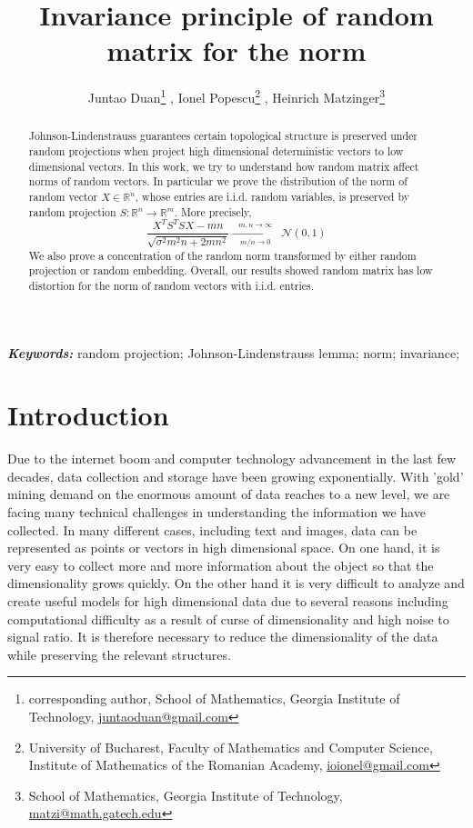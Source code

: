\documentclass[12pt]{extarticle}
\title{Invariance principle of random matrix for the norm}
\author{Juntao Duan\footnote{corresponding author, School of Mathematics, Georgia Institute of Technology, 
    \href{mailto:juntaoduan@gmail.com}{juntaoduan@gmail.com}}
    ,\quad  
    Ionel Popescu\footnote{ University of Bucharest, Faculty of Mathematics and Computer Science, Institute of Mathematics of the Romanian Academy, \href{mailto:ioionel@gmail.com }{ioionel@gmail.com}}
    ,\quad  
    Heinrich Matzinger\footnote{School of Mathematics, Georgia
 Institute of Technology, \href{mailto:matzi@math.gatech.edu}{matzi@math.gatech.edu}}
    }
\newcommand{\1}{\field{1}}
\numberwithin{equation}{section}
\providecommand{\keywords}[1]
{
  \small	
  \textbf{\textit{Keywords: }} #1
}
\begin{document}
\large
\maketitle


\begin{abstract}
	 Johnson-Lindenstrauss guarantees certain topological structure is preserved under random projections when project high dimensional deterministic vectors to low dimensional vectors. In this work, we try to understand how random matrix affect norms of random vectors. In particular we prove the distribution of the norm of random vector $X \in \mathbb{R}^n$, whose entries are i.i.d. random variables, is preserved by random projection $S:\mathbb{R}^n \to \mathbb{R}^m$. More precisely, 
\[
\frac{X^TS^TSX - mn}{\sqrt{\sigma^2 m^2n+2mn^2}} \xrightarrow[\quad m/n\to 0 \quad ]{ m,n\to \infty } \mathcal{N}(0,1)
\]
We also prove a concentration of the random norm transformed by either random projection or random embedding. Overall, our results showed random matrix has low distortion for the norm of random vectors with i.i.d. entries.
\end{abstract}
\keywords{random projection; Johnson-Lindenstrauss lemma;  norm; invariance;} 



\section{Introduction}

     Due to the internet boom and computer technology advancement in the last few decades, data collection and storage have been growing exponentially. With 'gold' mining demand on the enormous amount of data reaches to a new level, we are facing many technical challenges in understanding the information we have collected. In many different cases, including text and images, data can be represented as points or vectors in high dimensional space. On one hand, it is very easy to collect more and more information about the object so that the dimensionality grows quickly. On the other hand it is very difficult to analyze and create useful models for high dimensional data due to several reasons including computational difficulty as a result of curse of dimensionality and high noise to signal ratio. It is therefore necessary to reduce the dimensionality of the data while preserving the relevant structures. 
     
\end{document}
